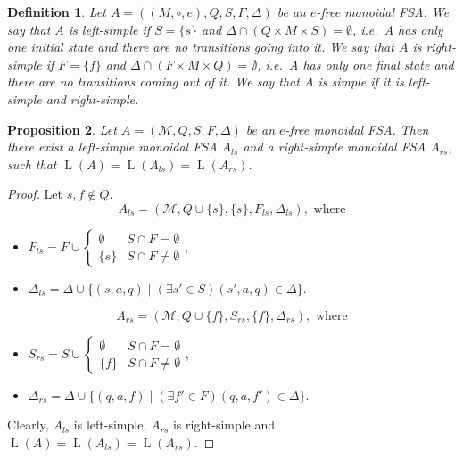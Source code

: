 \documentclass{article}
\newtheorem{definition}{Definition}[section]
\newtheorem{proposition}[definition]{Proposition}
\DeclareMathOperator{\Lang}{L}
\begin{document}
	\begin{definition} \label{def:simple_automata}
		Let $A = ((M, \circ, e), Q, S, F, \Delta)$ be an $e$-free monoidal FSA. We say that $A$ is left-simple if $S = \{s\}$ and $\Delta\cap (Q\times M\times S) = \emptyset$, i.e.\ A has only one initial state and there are no transitions going into it. We say that $A$ is right-simple if $F = \{f\}$ and $\Delta\cap (F\times M\times Q) = \emptyset$, i.e.\ A has only one final state and there are no transitions coming out of it. We say that $A$ is simple if it is left-simple and right-simple.
	\end{definition}

	\begin{proposition} \label{prop:l/r-simple_automata}
		Let $A = (\mathcal{M}, Q, S, F, \Delta)$ be an $e$-free monoidal FSA. Then there exist a left-simple monoidal FSA $A_{ls}$ and a right-simple monoidal FSA $A_{rs}$, such that $\Lang(A) = \Lang(A_{ls}) = \Lang(A_{rs})$.
	\end{proposition}
	\begin{proof}
		Let $s,f\notin Q$.
		\[ A_{ls} = (\mathcal{M}, Q\cup\{s\}, \{s\}, F_{ls}, \Delta_{ls}), \text{ where} \]
		\begin{itemize}
			\item \( F_{ls} = F\cup
				\begin{cases}
					\emptyset & S\cap F = \emptyset \\
					\{s\} & S\cap F\ne \emptyset
				\end{cases}
			\),
			\item \( \Delta_{ls} = \Delta\cup\{ (s,a,q)\mid (\exists s'\in S)(s',a,q)\in\Delta \} \).
		\end{itemize}
		\[ A_{rs} = (\mathcal{M}, Q\cup\{f\}, S_{rs}, \{f\}, \Delta_{rs}), \text{ where} \]
		\begin{itemize}
			\item \( S_{rs} = S\cup
			\begin{cases}
				\emptyset & S\cap F = \emptyset \\
				\{f\} & S\cap F\ne \emptyset
			\end{cases}
			\),
			\item \( \Delta_{rs} = \Delta\cup\{ (q,a,f)\mid (\exists f'\in F)(q,a,f')\in\Delta \} \).
		\end{itemize}
		Clearly, $A_{ls}$ is left-simple, $A_{rs}$ is right-simple and $\Lang(A) = \Lang(A_{ls}) = \Lang(A_{rs})$.
	\end{proof}
\end{document}
